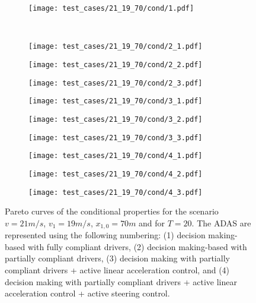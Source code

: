 \begin{figure}[H]
\centering
\begin{subfigure}{0.32\textwidth}
  \centering
  \texttt{[image: test\_cases/21\_19\_70/cond/1.pdf]}
\end{subfigure}\\
\begin{subfigure}{0.32\textwidth}
  \centering
  \texttt{[image: test\_cases/21\_19\_70/cond/2\_1.pdf]}
\end{subfigure} 
\begin{subfigure}{0.32\textwidth}
  \centering
  \texttt{[image: test\_cases/21\_19\_70/cond/2\_2.pdf]}
\end{subfigure}
\begin{subfigure}{0.32\textwidth}
  \centering
  \texttt{[image: test\_cases/21\_19\_70/cond/2\_3.pdf]}
\end{subfigure}
\begin{subfigure}{0.32\textwidth}
  \centering
  \texttt{[image: test\_cases/21\_19\_70/cond/3\_1.pdf]}
\end{subfigure}
\begin{subfigure}{0.32\textwidth}
  \centering
  \texttt{[image: test\_cases/21\_19\_70/cond/3\_2.pdf]}
\end{subfigure}
\begin{subfigure}{0.32\textwidth}
  \centering
  \texttt{[image: test\_cases/21\_19\_70/cond/3\_3.pdf]}
\end{subfigure}
\begin{subfigure}{0.32\textwidth}
  \centering
  \texttt{[image: test\_cases/21\_19\_70/cond/4\_1.pdf]}
\end{subfigure} 
\begin{subfigure}{0.32\textwidth}
  \centering
  \texttt{[image: test\_cases/21\_19\_70/cond/4\_2.pdf]}
\end{subfigure}
\begin{subfigure}{0.32\textwidth}
  \centering
  \texttt{[image: test\_cases/21\_19\_70/cond/4\_3.pdf]}
\end{subfigure}
\caption{Pareto curves of the conditional properties for the scenario $v = 21m/s$, $v_1 = 19m/s$, $x_{1,0} = 70m$ and for $T = 20$. The ADAS are represented using the following numbering: (1) decision making-based with fully compliant drivers, (2) decision making-based with partially compliant drivers, (3) decision making with partially compliant drivers + active linear acceleration control, and (4) decision making with partially compliant drivers + active linear acceleration control + active steering control.}
\label{fig:test_case_1_cond}
\end{figure}

